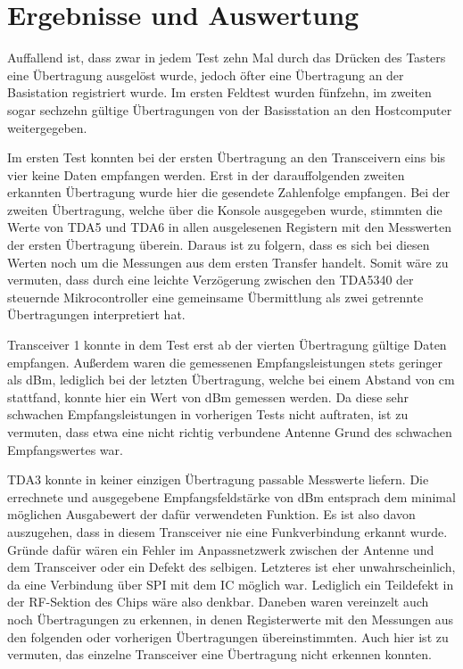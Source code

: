 \section{Ergebnisse und Auswertung}
Auffallend ist, dass zwar in jedem Test zehn Mal durch das Drücken des Tasters eine Übertragung ausgelöst wurde, jedoch öfter eine Übertragung an der Basistation registriert wurde. Im ersten Feldtest wurden fünfzehn, im zweiten sogar sechzehn gültige Übertragungen von der Basisstation an den Hostcomputer weitergegeben. 

Im ersten Test konnten bei der ersten Übertragung an den Transceivern eins bis vier keine Daten empfangen  werden. Erst in der darauffolgenden zweiten erkannten Übertragung wurde hier die gesendete Zahlenfolge empfangen. Bei der zweiten Übertragung, welche über die Konsole ausgegeben wurde, stimmten die Werte von TDA5 und TDA6 in allen ausgelesenen Registern mit den Messwerten der ersten Übertragung überein.  Daraus ist zu folgern, dass es sich bei diesen Werten noch um die Messungen aus dem ersten Transfer handelt. Somit wäre zu vermuten, dass durch eine leichte Verzögerung zwischen den TDA5340 der steuernde Mikrocontroller eine gemeinsame Übermittlung als zwei getrennte Übertragungen interpretiert hat.

Transceiver 1 konnte in dem Test erst ab der vierten Übertragung gültige Daten empfangen. Außerdem waren die gemessenen Empfangsleistungen stets geringer als \unit[-100]{dBm}, lediglich  bei der letzten Übertragung, welche bei einem Abstand von \unit[30]{cm} stattfand, konnte hier ein Wert von \unit[-97]{dBm} gemessen werden. Da diese  sehr schwachen Empfangsleistungen in vorherigen Tests nicht auftraten, ist zu vermuten, dass etwa eine nicht richtig verbundene Antenne  Grund des schwachen Empfangswertes war.

TDA3 konnte in keiner einzigen Übertragung passable Messwerte liefern. Die errechnete und ausgegebene Empfangsfeldstärke von \unit[-114]{dBm} entsprach dem minimal möglichen Ausgabewert der dafür verwendeten Funktion. Es ist also davon auszugehen, dass in diesem Transceiver nie eine Funkverbindung erkannt wurde. Gründe dafür wären ein Fehler im Anpassnetzwerk zwischen der Antenne und dem Transceiver oder ein Defekt des selbigen. Letzteres ist eher unwahrscheinlich, da eine Verbindung über \ac{SPI} mit dem \ac{IC} möglich war. Lediglich ein Teildefekt  in der RF-Sektion des Chips wäre also denkbar.
Daneben waren vereinzelt auch noch Übertragungen zu erkennen, in denen Registerwerte mit den Messungen aus den folgenden oder vorherigen Übertragungen übereinstimmten. Auch hier ist zu vermuten, das einzelne Transceiver eine Übertragung nicht erkennen konnten. 


